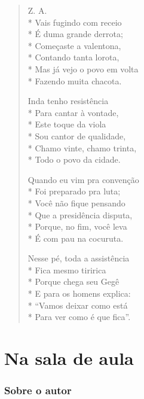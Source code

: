 \begin{verse}
Z. A.\\*
Vais fugindo com receio\\*
É duma grande derrota;\\*
Começaste a valentona, \\*
Contando tanta lorota,\\*
Mas já vejo o povo em volta\\*
Fazendo muita chacota.

Inda tenho resistência\\*
Para cantar à vontade,\\*
Este toque da viola\\*
Sou cantor de qualidade,\\*
Chamo vinte, chamo trinta,\\*
Todo o povo da cidade.

Quando eu vim pra convenção\\*
Foi preparado pra luta;\\*
Você não fique pensando\\*
Que a presidência disputa,\\*
Porque, no fim, você leva\\*
É com pau na cocuruta.

Nesse pé, toda a assistência\\*
Fica mesmo tiririca\\*
Porque chega seu Gegê\\*
E para os homens explica:\\*
“Vamos deixar como está\\*
Para ver como é que fica”.
\end{verse}

\paginabranca

\part{Na sala de aula}

\paginabranca

\section{Sobre o autor}

